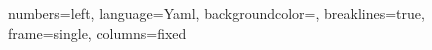 
\newcommand{\paragraphl}[1]{\paragraph{#1}\mbox{}\\} 

\renewcommand\lstlistlistingname{Listák jegyzéke}

\usepackage{amssymb}%
\usepackage{pifont}%
\newcommand{\cmark}{\ding{51}}%
\newcommand{\xmark}{\ding{55}}%

 {
	numbers=left,
	language=Yaml,
	backgroundcolor={\color{lightgray!40}},
	breaklines=true,
	frame=single,
	columns=fixed
}

\renewcommand{\lstlistingname}{kódrészlet}%
\renewcommand{\lstlistlistingname}{Kódrészletek jegyzéke}%